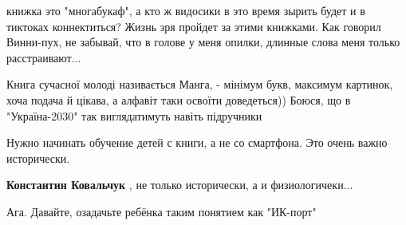 \begin{itemize}
 

книжка это "многабукаф", а кто ж видосики в это время зырить будет и в тиктоках
коннектиться? Жизнь зря пройдет за этими книжками. Как говорил Винни-пух, не
забывай, что в голове у меня опилки, длинные слова меня только расстраивают...


 

Книга сучасної молоді називається Манга, - мінімум букв, максимум картинок,
хоча подача й цікава, а алфавіт таки освоїти доведеться)) Боюся, що в
"Україна-2030" так виглядатимуть навіть підручники


 

Нужно начинать обучение детей с книги, а не со смартфона. Это очень важно
исторически.

\begin{itemize}
 
\textbf{Константин Ковальчук} , не только исторически, а и физиологичеки...
\end{itemize}

 
Ага.
Давайте, озадачьте ребёнка таким понятием как "ИК-порт"

 


\end{itemize}
